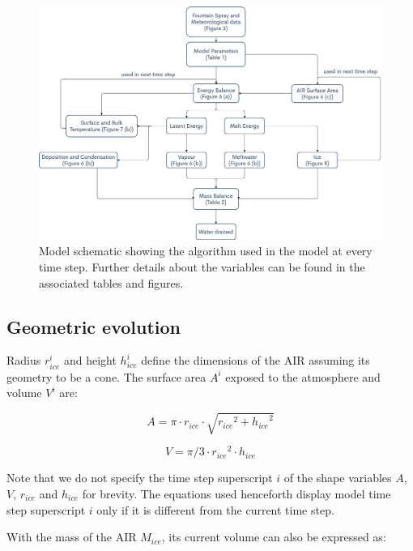 \documentclass[utf8]{frontiersSCNS} %
\begin{document}
  \begin{figure} \begin{center} \includegraphics[width=15 cm]{Figures/Figure_4.jpg} \end{center} \caption{Model
schematic showing the algorithm used in the model at every time step. Further details about the variables can be
found in the associated tables and figures.} \label{fig:schema} \end{figure}

\subsection{Geometric evolution}

Radius $r_{ice}^i$ and height $h_{ice}^i$ define the dimensions of the AIR assuming its geometry to be a cone. The
surface area $A^i$ exposed to the atmosphere and volume $V^i$ are:

\begin{equation} A = \pi \cdot r_{ice} \cdot \sqrt{{r_{ice}}^2 + {h_{ice}}^ 2} \label{eqn:A} \end{equation}

\begin{equation} V = \pi/3 \cdot {r_{ice}}^2 \cdot h_{ice} \label{eqn:V} \end{equation}

Note that we do not specify the time step superscript $i$ of the shape variables $A$, $V$, $r_{ice}$ and $h_{ice}$ for
brevity.  The equations used henceforth display model time step superscript $i$ only if it is different from the
current time step.

With the mass of the AIR $M_{ice}$, its current volume can also be expressed as: 
\end{document}
